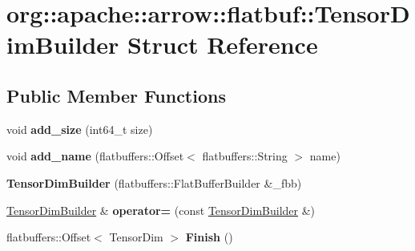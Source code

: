\hypertarget{structorg_1_1apache_1_1arrow_1_1flatbuf_1_1TensorDimBuilder}{}\section{org\+:\+:apache\+:\+:arrow\+:\+:flatbuf\+:\+:Tensor\+Dim\+Builder Struct Reference}
\label{structorg_1_1apache_1_1arrow_1_1flatbuf_1_1TensorDimBuilder}
\subsection*{Public Member Functions}
\begin{DoxyCompactItemize}
\item 
void {\bfseries add\+\_\+size} (int64\+\_\+t size)\hypertarget{structorg_1_1apache_1_1arrow_1_1flatbuf_1_1TensorDimBuilder_ad961d253aa1dab78feb183f9c2ef9ed6}{}\label{structorg_1_1apache_1_1arrow_1_1flatbuf_1_1TensorDimBuilder_ad961d253aa1dab78feb183f9c2ef9ed6}

\item 
void {\bfseries add\+\_\+name} (flatbuffers\+::\+Offset$<$ flatbuffers\+::\+String $>$ name)\hypertarget{structorg_1_1apache_1_1arrow_1_1flatbuf_1_1TensorDimBuilder_a2ff9b6180937a06fe6d2c3c3db24c5ec}{}\label{structorg_1_1apache_1_1arrow_1_1flatbuf_1_1TensorDimBuilder_a2ff9b6180937a06fe6d2c3c3db24c5ec}

\item 
{\bfseries Tensor\+Dim\+Builder} (flatbuffers\+::\+Flat\+Buffer\+Builder \&\+\_\+fbb)\hypertarget{structorg_1_1apache_1_1arrow_1_1flatbuf_1_1TensorDimBuilder_a9e7a23762d7f93b2f5719745f63e104d}{}\label{structorg_1_1apache_1_1arrow_1_1flatbuf_1_1TensorDimBuilder_a9e7a23762d7f93b2f5719745f63e104d}

\item 
\hyperlink{structorg_1_1apache_1_1arrow_1_1flatbuf_1_1TensorDimBuilder}{Tensor\+Dim\+Builder} \& {\bfseries operator=} (const \hyperlink{structorg_1_1apache_1_1arrow_1_1flatbuf_1_1TensorDimBuilder}{Tensor\+Dim\+Builder} \&)\hypertarget{structorg_1_1apache_1_1arrow_1_1flatbuf_1_1TensorDimBuilder_a25a3f39aeada58fca9cb36b84303101a}{}\label{structorg_1_1apache_1_1arrow_1_1flatbuf_1_1TensorDimBuilder_a25a3f39aeada58fca9cb36b84303101a}

\item 
flatbuffers\+::\+Offset$<$ Tensor\+Dim $>$ {\bfseries Finish} ()\hypertarget{structorg_1_1apache_1_1arrow_1_1flatbuf_1_1TensorDimBuilder_a26c4880b6bfca9d5c7747b5668583230}{}\label{structorg_1_1apache_1_1arrow_1_1flatbuf_1_1TensorDimBuilder_a26c4880b6bfca9d5c7747b5668583230}

\end{DoxyCompactItemize}

